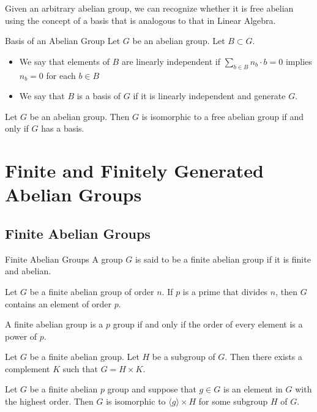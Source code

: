 \documentclass[a4paper]{article}
\begin{document}
Given an arbitrary abelian group, we can recognize whether it is free abelian using the concept of a basis that is analogous to that in Linear Algebra. 

\begin{defn}{Basis of an Abelian Group}{} Let $G$ be an abelian group. Let $B\subset G$. 
\begin{itemize}
\item We say that elements of $B$ are linearly independent if $\sum_{b\in B}n_b\cdot b=0$ implies $n_b=0$ for each $b\in B$
\item We say that $B$ is a basis of $G$ if it is linearly independent and generate $G$. 
\end{itemize}
\end{defn}

\begin{prp}{}{} Let $G$ be an abelian group. Then $G$ is isomorphic to a free abelian group if and only if $G$ has a basis. 
\end{prp}

\pagebreak
\section{Finite and Finitely Generated Abelian Groups}
\subsection{Finite Abelian Groups}
\begin{defn}{Finite Abelian Groups}{} A group $G$ is said to be a finite abelian group if it is finite and abelian. 
\end{defn}

\begin{lmm}{}{} Let $G$ be a finite abelian group of order $n$. If $p$ is a prime that divides $n$, then $G$ contains an element of order $p$. 
\end{lmm}

\begin{lmm}{}{} A finite abelian group is a $p$ group if and only if the order of every element is a power of $p$. 
\end{lmm}

\begin{lmm}{}{} Let $G$ be a finite abelian group. Let $H$ be a subgroup of $G$. Then there exists a complement $K$ such that $G=H\times K$. 
\end{lmm}

\begin{lmm}{}{} Let $G$ be a finite abelian $p$ group and suppose that $g\in G$ is an element in $G$ with the highest order. Then $G$ is isomorphic to $\langle g\rangle\times H$ for some subgroup $H$ of $G$. 
\end{lmm}
\end{document}

